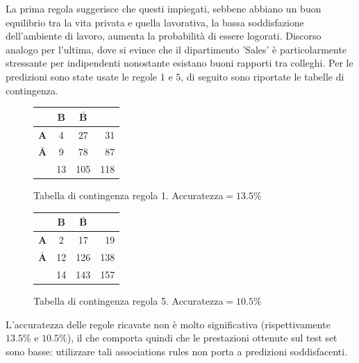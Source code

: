 \documentclass[a4paper,9pt]{article}
\begin{document}
La prima regola suggerisce che questi impiegati, sebbene abbiano un buon equilibrio tra la vita privata e quella lavorativa, la bassa soddisfazione dell'ambiente di lavoro, aumenta la probabilità di essere logorati. Discorso analogo per l'ultima, dove si evince che il dipartimento 'Sales' è particolarmente stressante per indipendenti nonostante esistano buoni rapporti tra colleghi.
Per le predizioni sono state usate le regole $1$ e $5$, di seguito sono riportate le tabelle di contingenza.

\begin{figure}[H]
  \centering
  \begin{minipage}{.45\textwidth}
    \centering
    \begin{tabular}{l|cc|r}
& \bfseries B & $\bar{\textbf {B}}$ &\\
\hline
\bfseries A & 4 & 27 &31\\
 $\bar{\textbf {A}}$ & 9&78&87\\
\hline
& 13&105&118\\
\end{tabular}
    \caption{Tabella di contingenza regola 1. Accuratezza$=13.5\%$}
  \end{minipage}
  \begin{minipage}{.45\textwidth}
    \centering
    \begin{tabular}{l|cc|r}
& \bfseries B &  $\bar{\textbf {B}}$ &\\
\hline
\bfseries A & 2& 17 &19\\
 $\bar{\textbf {A}}$ & 12&126&138\\
\hline
& 14&143&157\\
\end{tabular}
    \caption{Tabella di contingenza regola 5.  Accuratezza$=10.5\%$}
  \end{minipage}
  \end{figure}
L'accuratezza delle regole ricavate non è molto significativa (rispettivamente $13.5\%$ e $10.5\%$), il che comporta quindi che le prestazioni ottenute sul test set sono basse: utilizzare tali associations rules non porta a predizioni soddisfacenti.

	
\end{document}
